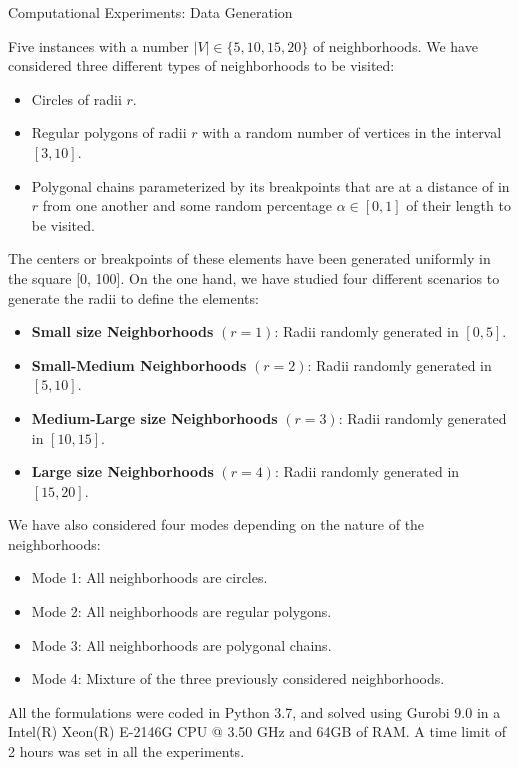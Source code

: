 \documentclass[slidestop,usepdftitle=false,10pt]{beamer}
\begin{document}
	\begin{frame}{Computational Experiments: Data Generation}
 	\begin{footnotesize}
	     Five instances with a number $|V|\in\{5,10,15, 20\}$ of neighborhoods. We have considered three different types of neighborhoods to be visited:
        \begin{itemize}
            \item Circles of radii $r$.
            \item Regular polygons of radii $r$ with a random number of vertices in the interval $[3, 10]$.
            \item Polygonal chains parameterized by its breakpoints that are at a distance of in $r$ from one another and some random percentage $\alpha\in [0, 1]$ of their length to be visited.
        \end{itemize}
	    
	    The centers or breakpoints of these elements have been generated uniformly in the square [0, 100]. On the one hand, we have studied four different scenarios to generate the radii to define the elements:
        \begin{itemize}
        	\item \textbf{Small size Neighborhoods} $(r=1)$: Radii randomly generated in $[0, 5]$.
        	\item \textbf{Small-Medium Neighborhoods} $(r=2)$: Radii randomly generated in $[5, 10]$.
        	\item \textbf{Medium-Large size Neighborhoods} $(r=3)$: Radii randomly generated in $[10, 15]$.
        	\item \textbf{Large size Neighborhoods} $(r=4)$: Radii randomly generated in $[15, 20]$.
        \end{itemize}
    \end{footnotesize}
    \end{frame}
    
    \begin{frame}
        We have also considered four modes depending on the nature of the neighborhoods:

        \begin{itemize}
        	\item Mode 1: All neighborhoods are circles.
        	\item Mode 2: All neighborhoods are regular polygons.
        	\item Mode 3: All neighborhoods are polygonal chains.
        	\item Mode 4: Mixture of the three previously  considered neighborhoods.
        \end{itemize}
        
        \bigskip
        All the formulations were coded in Python 3.7, and solved using Gurobi 9.0 in a Intel(R) Xeon(R) E-2146G CPU @ 3.50 GHz and 64GB of RAM. A time limit of 2 hours was set in all the experiments.
        
	\end{frame}
	
\end{document}
